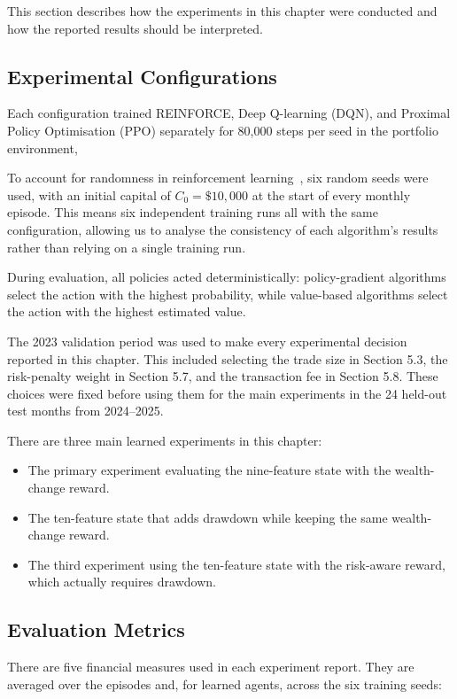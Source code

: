 This section describes how the experiments in this chapter were
conducted and how the reported results should be interpreted.

\subsection{Experimental Configurations}

Each configuration trained REINFORCE, Deep Q-learning (DQN), and
Proximal Policy Optimisation (PPO) separately for 80,000 steps per seed
in the portfolio environment,

To account for randomness in reinforcement learning~\cite{henderson2018}, six random seeds
were used, with an initial capital of \(C_{0} = \$ 10,000\) at the start
of every monthly episode. This means six independent training runs all
with the same configuration, allowing us to analyse the consistency of
each algorithm's results rather than relying on a single training run.

During evaluation, all policies acted deterministically: policy-gradient
algorithms select the action with the highest probability, while
value-based algorithms select the action with the highest estimated
value.

The 2023 validation period was used to make every experimental decision
reported in this chapter. This included selecting the trade size in
Section 5.3, the risk-penalty weight in Section 5.7, and the transaction
fee in Section 5.8. These choices were fixed before using them for the
main experiments in the 24 held-out test months from 2024--2025.

There are three main learned experiments in this chapter:

\begin{itemize}
\item
  The primary experiment evaluating the nine-feature state with the
  wealth-change reward.
\item
  The ten-feature state that adds drawdown while keeping the same
  wealth-change reward.
\item
  The third experiment using the ten-feature state with the risk-aware
  reward, which actually requires drawdown.
\end{itemize}

\subsection{Evaluation Metrics}

There are five financial measures used in each experiment report. They
are averaged over the episodes and, for learned agents, across the six
training seeds:

